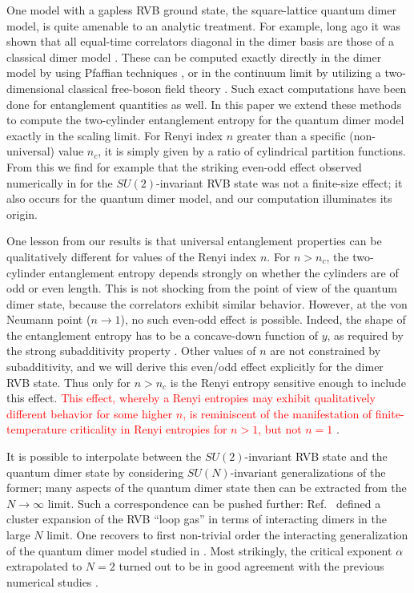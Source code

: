 \documentclass[11pt]{iopart}
\begin{document}
One model with a gapless RVB ground state, the square-lattice quantum dimer model, is quite amenable to an analytic treatment. For example, long ago it was shown that all equal-time correlators diagonal in the dimer basis are those of a classical dimer model \cite{RokhsarKivelson}. These can be computed exactly directly in the dimer model by using Pfaffian techniques \cite{Kasteleyn,Fisher,FisherStephenson}, or in the continuum limit by utilizing a two-dimensional classical free-boson field theory \cite{Fradkinbook,Henley}. Such exact computations have been done for entanglement quantities as well\cite{FradkinMoore,Hsu2009,Shannonee,Oshikawa,Zaletel,Stephan2011}. In this paper we extend these methods to compute the two-cylinder entanglement entropy for the quantum dimer model exactly in the scaling limit. For Renyi index $n$ greater than a specific (non-universal) value $n_c$, it is simply given by a ratio of cylindrical partition functions. From this we find for example that the striking even-odd effect 
observed numerically in \cite{Ju2012} for 
the $SU(2)$-invariant RVB state was not a finite-size effect; it also occurs for the quantum dimer model, and our computation illuminates its origin.



One lesson from our results is that universal entanglement properties can be qualitatively different for values of the Renyi index $n$. For $n>n_c$, the two-cylinder entanglement entropy depends strongly on whether the cylinders are of odd or even length. This is not shocking from the point of view of the quantum dimer state, because the correlators exhibit similar behavior. However, at the von Neumann point ($n\to 1$), no such even-odd effect is possible. Indeed, the shape of the entanglement entropy has to be a concave-down function of $y$, as required by the strong subadditivity property \cite{Strongsubadditivity}. Other values of $n$ are not constrained by subadditivity, and we will derive this even/odd effect explicitly for the dimer RVB state. 
Thus only for $n>n_c$ is the Renyi entropy sensitive enough to include this effect. 
\textcolor{red}{
This effect, whereby a Renyi entropies may exhibit qualitatively different behavior for some higher $n$, is reminiscent of the manifestation of finite-temperature criticality in Renyi entropies for $n>1$, but not $n=1$} \cite{RenyiXing}. 

It is possible to interpolate between the $SU(2)$-invariant RVB state and the quantum dimer state by considering $SU(N)$-invariant generalizations of the former; many aspects of the quantum dimer state then can be extracted from the $N\to\infty$ limit. Such a correspondence can be pushed further: Ref.~\cite{Damle} defined a cluster expansion of the RVB ``loop gas''\cite{Sutherland_loops} in terms of interacting dimers in the large $N$ limit. One recovers to first non-trivial order the interacting generalization of the quantum dimer model studied in  \cite{Alet_dimers1,Alet_dimers2}. Most strikingly, the critical exponent $\alpha$ extrapolated to $N=2$ turned out to be in good agreement with the previous numerical studies \cite{RVB1,RVB2}.
\end{document}
